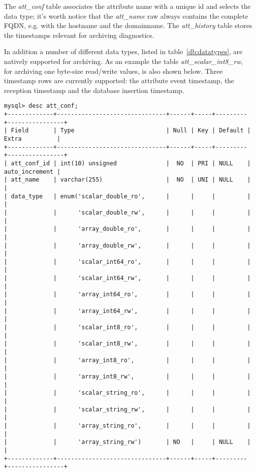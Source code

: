 \documentclass[11pt,a4paper]{article}
\begin{document}
The \emph{att\_conf} table associates the attribute name with a unique id
and selects the data type; it's worth notice that the \emph{att\_name}
raw always contains the complete FQDN, e.g. with the hostname and the
domainname.
The \emph{att\_history} table stores the timestamps relevant for
archiving diagnostics.

In addition a number of different data types, listed in
table~\ref{db:datatypes}, are natively supported for archiving.
As an example the table \emph{att\_scalar\_int8\_rw}, for archiving
one \mbox{byte-size} \mbox{read/write} values, is also shown below.
Three timestamp rows are currently supported: the attribute event
timestamp, the reception timestamp and the database insertion timestamp.

{\footnotesize
	\begin{Verbatim}
mysql> desc att_conf;
+-------------+-------------------------------+------+-----+---------+----------------+
| Field       | Type                          | Null | Key | Default | Extra          |
+-------------+-------------------------------+------+-----+---------+----------------+
| att_conf_id | int(10) unsigned              |  NO  | PRI | NULL    | auto_increment |
| att_name    | varchar(255)                  |  NO  | UNI | NULL    |                |
| data_type   | enum('scalar_double_ro',      |      |     |         |                |
|             |      'scalar_double_rw',      |      |     |         |                |
|             |      'array_double_ro',       |      |     |         |                |
|             |      'array_double_rw',       |      |     |         |                |
|             |      'scalar_int64_ro',       |      |     |         |                |
|             |      'scalar_int64_rw',       |      |     |         |                |
|             |      'array_int64_ro',        |      |     |         |                |
|             |      'array_int64_rw',        |      |     |         |                |
|             |      'scalar_int8_ro',        |      |     |         |                |
|             |      'scalar_int8_rw',        |      |     |         |                |
|             |      'array_int8_ro',         |      |     |         |                |
|             |      'array_int8_rw',         |      |     |         |                |
|             |      'scalar_string_ro',      |      |     |         |                |
|             |      'scalar_string_rw',      |      |     |         |                |
|             |      'array_string_ro',       |      |     |         |                |
|             |      'array_string_rw')       | NO   |     | NULL    |                |
+-------------+-------------------------------+------+-----+---------+----------------+
	\end{Verbatim}
}
\end{document}

